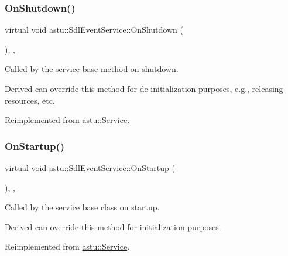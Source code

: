 \subsubsection{\texorpdfstring{On\+Shutdown()}{OnShutdown()}}
{\footnotesize\ttfamily virtual void astu\+::\+Sdl\+Event\+Service\+::\+On\+Shutdown (\begin{DoxyParamCaption}{ }\end{DoxyParamCaption})\hspace{0.3cm}{\ttfamily [override]}, {\ttfamily [protected]}, {\ttfamily [virtual]}}

Called by the service base method on shutdown.

Derived can override this method for de-\/initialization purposes, e.\+g., releasing resources, etc. 

Reimplemented from \hyperlink{classastu_1_1Service_a1e1dff727df791c57fae782d8a613c5f}{astu\+::\+Service}.

\mbox{\label{classastu_1_1SdlEventService_a71805a124600a23e48158daa5dc57fff}} 
\subsubsection{\texorpdfstring{On\+Startup()}{OnStartup()}}
{\footnotesize\ttfamily virtual void astu\+::\+Sdl\+Event\+Service\+::\+On\+Startup (\begin{DoxyParamCaption}{ }\end{DoxyParamCaption})\hspace{0.3cm}{\ttfamily [override]}, {\ttfamily [protected]}, {\ttfamily [virtual]}}

Called by the service base class on startup.

Derived can override this method for initialization purposes. 

Reimplemented from \hyperlink{classastu_1_1Service_a357dc663e000b1f086f681ec3c459bfe}{astu\+::\+Service}.

\mbox{\label{classastu_1_1SdlEventService_a67090f42250433506b8bfb4254df9e50}} 

